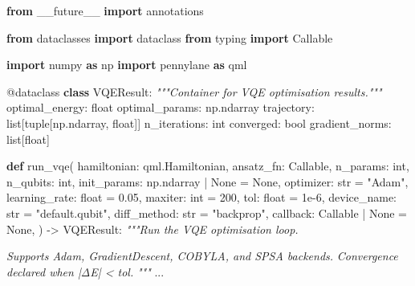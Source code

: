 \documentclass[
  11pt,
]{report}
\newenvironment{Shaded}{}{}
\newcommand{\AttributeTok}[1]{\textcolor[rgb]{0.49,0.56,0.16}{#1}}
\newcommand{\BuiltInTok}[1]{\textcolor[rgb]{0.00,0.50,0.00}{#1}}
\newcommand{\CommentTok}[1]{\textcolor[rgb]{0.38,0.63,0.69}{\textit{#1}}}
\newcommand{\DecValTok}[1]{\textcolor[rgb]{0.25,0.63,0.44}{#1}}
\newcommand{\FloatTok}[1]{\textcolor[rgb]{0.25,0.63,0.44}{#1}}
\newcommand{\ImportTok}[1]{\textcolor[rgb]{0.00,0.50,0.00}{\textbf{#1}}}
\newcommand{\KeywordTok}[1]{\textcolor[rgb]{0.00,0.44,0.13}{\textbf{#1}}}
\newcommand{\NormalTok}[1]{#1}
\newcommand{\OperatorTok}[1]{\textcolor[rgb]{0.40,0.40,0.40}{#1}}
\newcommand{\StringTok}[1]{\textcolor[rgb]{0.25,0.44,0.63}{#1}}
\newcommand{\VariableTok}[1]{\textcolor[rgb]{0.10,0.09,0.49}{#1}}
\begin{document}
\begin{Shaded}
\begin{Highlighting}[]
\ImportTok{from}\NormalTok{ \_\_future\_\_ }\ImportTok{import}\NormalTok{ annotations}

\ImportTok{from}\NormalTok{ dataclasses }\ImportTok{import}\NormalTok{ dataclass}
\ImportTok{from}\NormalTok{ typing }\ImportTok{import}\NormalTok{ Callable}

\ImportTok{import}\NormalTok{ numpy }\ImportTok{as}\NormalTok{ np}
\ImportTok{import}\NormalTok{ pennylane }\ImportTok{as}\NormalTok{ qml}


\AttributeTok{@dataclass}
\KeywordTok{class}\NormalTok{ VQEResult:}
    \CommentTok{"""Container for VQE optimisation results."""}
\NormalTok{    optimal\_energy: }\BuiltInTok{float}
\NormalTok{    optimal\_params: np.ndarray}
\NormalTok{    trajectory: }\BuiltInTok{list}\NormalTok{[}\BuiltInTok{tuple}\NormalTok{[np.ndarray, }\BuiltInTok{float}\NormalTok{]]}
\NormalTok{    n\_iterations: }\BuiltInTok{int}
\NormalTok{    converged: }\BuiltInTok{bool}
\NormalTok{    gradient\_norms: }\BuiltInTok{list}\NormalTok{[}\BuiltInTok{float}\NormalTok{]}


\KeywordTok{def}\NormalTok{ run\_vqe(}
\NormalTok{    hamiltonian: qml.Hamiltonian,}
\NormalTok{    ansatz\_fn: Callable,}
\NormalTok{    n\_params: }\BuiltInTok{int}\NormalTok{,}
\NormalTok{    n\_qubits: }\BuiltInTok{int}\NormalTok{,}
\NormalTok{    init\_params: np.ndarray }\OperatorTok{|} \VariableTok{None} \OperatorTok{=} \VariableTok{None}\NormalTok{,}
\NormalTok{    optimizer: }\BuiltInTok{str} \OperatorTok{=} \StringTok{"Adam"}\NormalTok{,}
\NormalTok{    learning\_rate: }\BuiltInTok{float} \OperatorTok{=} \FloatTok{0.05}\NormalTok{,}
\NormalTok{    maxiter: }\BuiltInTok{int} \OperatorTok{=} \DecValTok{200}\NormalTok{,}
\NormalTok{    tol: }\BuiltInTok{float} \OperatorTok{=} \FloatTok{1e{-}6}\NormalTok{,}
\NormalTok{    device\_name: }\BuiltInTok{str} \OperatorTok{=} \StringTok{"default.qubit"}\NormalTok{,}
\NormalTok{    diff\_method: }\BuiltInTok{str} \OperatorTok{=} \StringTok{"backprop"}\NormalTok{,}
\NormalTok{    callback: Callable }\OperatorTok{|} \VariableTok{None} \OperatorTok{=} \VariableTok{None}\NormalTok{,}
\NormalTok{) }\OperatorTok{{-}\textgreater{}}\NormalTok{ VQEResult:}
    \CommentTok{"""Run the VQE optimisation loop.}

\CommentTok{    Supports Adam, GradientDescent, COBYLA, and SPSA backends.}
\CommentTok{    Convergence declared when |ΔE| \textless{} tol.}
\CommentTok{    """}
\NormalTok{    ...}
\end{Highlighting}
\end{Shaded}
\end{document}

